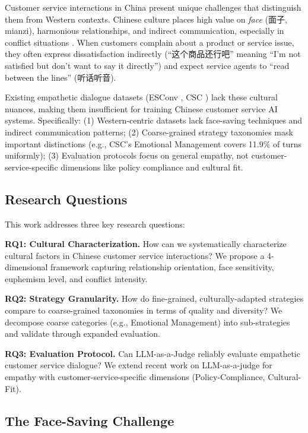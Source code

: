 \documentclass[11pt]{article}
\begin{document}
Customer service interactions in China present unique challenges that distinguish them from Western contexts. Chinese culture places high value on \textit{face} (面子, mianzi), harmonious relationships, and indirect communication, especially in conflict situations \cite{hofstede_1984}. When customers complain about a product or service issue, they often express dissatisfaction indirectly (``这个商品还行吧'' meaning ``I'm not satisfied but don't want to say it directly'') and expect service agents to ``read between the lines'' (听话听音).

Existing empathetic dialogue datasets (ESConv \cite{ESConv_2022}, CSC \cite{CSC_2024}) lack these cultural nuances, making them insufficient for training Chinese customer service AI systems. Specifically: (1) Western-centric datasets lack face-saving techniques and indirect communication patterns; (2) Coarse-grained strategy taxonomies mask important distinctions (e.g., CSC's Emotional Management covers 11.9\% of turns uniformly); (3) Evaluation protocols focus on general empathy, not customer-service-specific dimensions like policy compliance and cultural fit.

\subsection*{Research Questions}

This work addresses three key research questions:

\textbf{RQ1: Cultural Characterization.} How can we systematically characterize cultural factors in Chinese customer service interactions? We propose a 4-dimensional framework capturing relationship orientation, face sensitivity, euphemism level, and conflict intensity.

\textbf{RQ2: Strategy Granularity.} How do fine-grained, culturally-adapted strategies compare to coarse-grained taxonomies in terms of quality and diversity? We decompose coarse categories (e.g., Emotional Management) into sub-strategies and validate through expanded evaluation.

\textbf{RQ3: Evaluation Protocol.} Can LLM-as-a-Judge reliably evaluate empathetic customer service dialogue? We extend recent work on LLM-as-a-judge for empathy \cite{nature_llm_empathy_2025} with customer-service-specific dimensions (Policy-Compliance, Cultural-Fit).

\subsection*{The Face-Saving Challenge}
\end{document}
